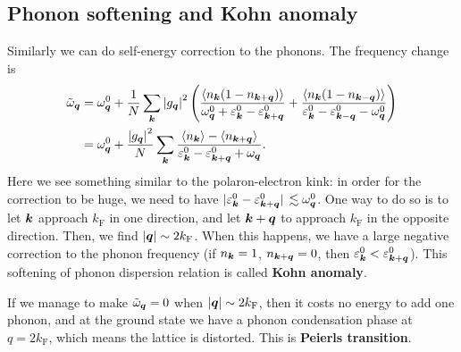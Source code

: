 \documentclass[hyperref, a4paper]{article}
\newcommand*{\concept}[1]{{\textbf{#1}}}
\begin{document}
\subsection{Phonon softening and Kohn anomaly}

Similarly we can do self-energy correction to the phonons.
The frequency change is 
\begin{equation}
    \begin{aligned}
        \tilde{\omega}_{\vb*{q}} &= \omega^0_{\vb*{q}} + \frac{1}{N} \sum_{\vb*{k}} \abs{g_{\vb*{q}}}^2 \left(
            \frac{\expval{n_{\vb*{k}} (1 - n_{\vb*{k} + \vb*{q}})}}{\omega^0_{\vb*{q}} + \varepsilon^0_{\vb*{k}} - \varepsilon^0_{\vb*{k} + \vb*{q}}}
            + \frac{\expval{n_{\vb*{k}} (1 - n_{\vb*{k} - \vb*{q}})}}{\varepsilon^0_{\vb*{k}} - \varepsilon^0_{\vb*{k} - \vb*{q}} - \omega^0_{\vb*{q}}}
        \right) \\
        &= \omega^0_{\vb*{q}} + \frac{\abs{g_{\vb*{q}}}^2}{N} \sum_{\vb*{k}} 
        \frac{\expval{n_{\vb*{k}}} - \expval{n_{\vb*{k} + \vb*{q}}}}{\varepsilon^0_{\vb*{k}} - \varepsilon^0_{\vb*{k} + \vb*{q}} + \omega_{\vb*{q}}}.
    \end{aligned}
\end{equation}
Here we see something similar to the polaron-electron kink:
in order for the correction to be huge, 
we need to have $\abs*{\varepsilon^0_{\vb*{k}} - \varepsilon^0_{\vb*{k} + \vb*{q}}} \lesssim \omega^0_{\vb*{q}}$.
One way to do so is to let $\vb*{k}$ approach $k_\text{F}$ in one direction,
and let $\vb*{k} + \vb*{q}$ to approach $k_{\text{F}}$ in the opposite direction.
Then, we find $\abs{\vb*{q}} \sim 2 k_{\text{F}}$.
When this happens, we have a large negative correction to the phonon frequency 
(if $n_{\vb*{k}} = 1$, $n_{\vb*{k} + \vb*{q}} = 0$, then $\varepsilon^0_{\vb*{k}} < \varepsilon^0_{\vb*{k} + \vb*{q}}$).
This softening of phonon dispersion relation 
is called \concept{Kohn anomaly}.

If we manage to make $\tilde{\omega}_{\vb*{q}} = 0$ when $\abs{\vb*{q}} \sim 2 k_{\text{F}}$,
then it costs no energy to add one phonon, 
and at the ground state we have a phonon condensation phase at $q = 2 k_{\text{F}}$,
which means the lattice is distorted.
This is \concept{Peierls transition}.
\end{document}

